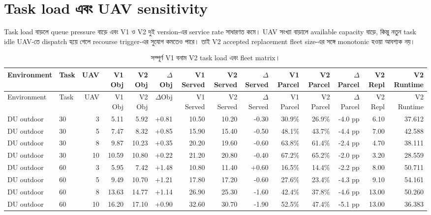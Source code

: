 \documentclass[10pt,a4paper]{article}
\begin{document}
\section{Task load এবং UAV sensitivity}
Task load বাড়লে queue pressure বাড়ে এবং V1 ও V2 দুই version-এর service rate সাধারণত কমে। UAV সংখ্যা বাড়ালে available capacity বাড়ে, কিন্তু নতুন task idle UAV-তে dispatch হয়ে গেলে recourse trigger-এর সুযোগ কমতেও পারে। তাই V2 accepted replacement fleet size-এর সঙ্গে monotonic হওয়া আবশ্যক নয়।
\begin{landscape}\begin{longtable}{@{}llrrrrrrrrrrrr@{}}
\caption{সম্পূর্ণ V1 বনাম V2 task load এবং fleet matrix।}\label{tab:v2-full-matrix}\\
\toprule Environment & Task & UAV & V1 Obj & V2 Obj & $\Delta$Obj & V1 Served & V2 Served & $\Delta$Served & V1 Parcel & V2 Parcel & $\Delta$Parcel & V2 Repl & V2 Runtime\\\midrule
\endfirsthead\toprule Environment & Task & UAV & V1 Obj & V2 Obj & $\Delta$Obj & V1 Served & V2 Served & $\Delta$Served & V1 Parcel & V2 Parcel & $\Delta$Parcel & V2 Repl & V2 Runtime\\\midrule\endhead
DU outdoor & 30 & 3 & 5.11 & 5.92 & +0.81 & 10.50 & 10.20 & -0.30 & 30.9\% & 26.9\% & -4.0 pp & 6.10 & 37.612 \\

DU outdoor & 30 & 5 & 7.47 & 8.32 & +0.85 & 15.90 & 15.40 & -0.50 & 48.1\% & 43.7\% & -4.4 pp & 7.00 & 42.588 \\

DU outdoor & 30 & 8 & 9.87 & 10.23 & +0.35 & 20.20 & 19.60 & -0.60 & 63.8\% & 61.4\% & -2.4 pp & 4.70 & 38.111 \\

DU outdoor & 30 & 10 & 10.59 & 10.80 & +0.22 & 21.20 & 20.80 & -0.40 & 67.2\% & 65.2\% & -2.0 pp & 3.20 & 28.559 \\

DU outdoor & 60 & 3 & 5.95 & 7.42 & +1.48 & 10.80 & 11.40 & +0.60 & 16.5\% & 14.4\% & -2.2 pp & 8.00 & 50.711 \\

DU outdoor & 60 & 5 & 9.49 & 10.70 & +1.21 & 17.80 & 17.20 & -0.60 & 27.6\% & 23.4\% & -4.3 pp & 9.10 & 54.161 \\

DU outdoor & 60 & 8 & 13.63 & 14.77 & +1.14 & 26.90 & 25.30 & -1.60 & 42.4\% & 37.8\% & -4.6 pp & 13.00 & 50.260 \\

DU outdoor & 60 & 10 & 16.20 & 17.10 & +0.90 & 32.60 & 30.70 & -1.90 & 52.5\% & 47.4\% & -5.1 pp & 13.00 & 36.383 \\


\end{longtable}
\end{landscape}
\end{document}
